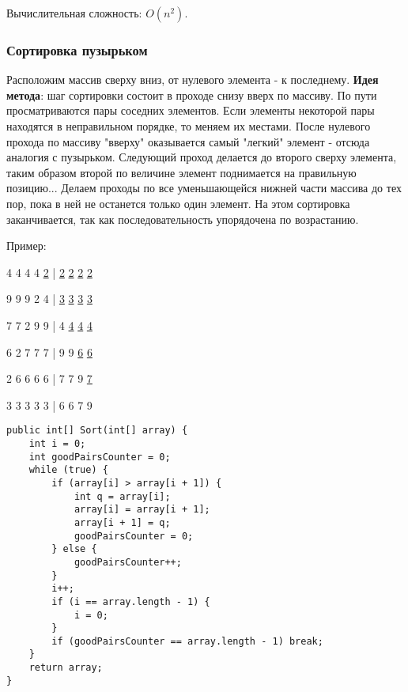 \documentclass[12pt]{matmex-diploma}
\begin{document}
            Вычислительная сложность: $O(n^2)$.

        \subsubsection*{Сортировка пузырьком}
        
            Расположим массив сверху вниз, от нулевого элемента - к последнему.
            \textbf{Идея метода}: шаг сортировки состоит в проходе снизу вверх по массиву. По пути просматриваются пары соседних элементов. Если элементы некоторой пары находятся в неправильном порядке, то меняем их местами.
            После нулевого прохода по массиву "вверху" оказывается самый "легкий" элемент - отсюда аналогия с пузырьком. Следующий проход делается до второго сверху элемента, таким образом второй по величине элемент поднимается на правильную позицию...
            Делаем проходы по все уменьшающейся нижней части массива до тех пор, пока в ней не останется только один элемент. На этом сортировка заканчивается, так как последовательность упорядочена по возрастанию.
            
            Пример:
            
            4   4   4   4   \underline{2}    |    \underline{2}   \underline{2}   \underline{2}   \underline{2}
            
            9   9   9   2   4    |    \underline{3}   \underline{3}   \underline{3}   \underline{3}
            
            7   7   2   9   9    |    4   \underline{4}   \underline{4}   \underline{4}   
            
            6   2   7   7   7    |    9   9   \underline{6}   \underline{6}
            
            2   6   6   6   6    |    7   7   9   \underline{7}
            
            3   3   3   3   3    |    6   6   7   9
            
            \begin{verbatim}
public int[] Sort(int[] array) {
    int i = 0;
    int goodPairsCounter = 0;
    while (true) {
        if (array[i] > array[i + 1]) {
            int q = array[i];
            array[i] = array[i + 1];
            array[i + 1] = q;
            goodPairsCounter = 0;
        } else {
            goodPairsCounter++;
        }
        i++;
        if (i == array.length - 1) {
            i = 0;
        }
        if (goodPairsCounter == array.length - 1) break;
    }
    return array;
}
            \end{verbatim}
            
\end{document}
